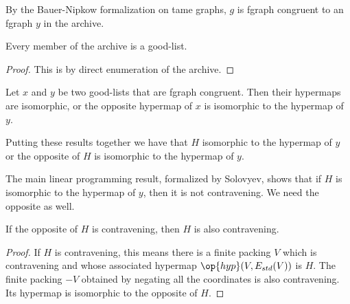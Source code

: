 By the Bauer-Nipkow formalization on tame graphs, $g$ is 
fgraph congruent
to an fgraph $y$ in the archive.

\begin{lemma}
 Every member of the archive 
is a good-list.
\end{lemma} 

\begin{proof} This is by direct enumeration of the archive.
\end{proof}

\begin{lemma}
Let $x$ and $y$ be two good-lists that are fgraph congruent.
Then their hypermaps are isomorphic, or the opposite hypermap of $x$
is isomorphic to the hypermap of $y$.
\end{lemma} 

Putting these results together we have that $H$ isomorphic to the
hypermap of $y$ or the opposite of $H$ is isomorphic to the hypermap
of $y$.

The main linear programming result, formalized by Solovyev, shows
that if $H$ is isomorphic to the hypermap of $y$, then it is not
contravening.  We need the opposite as well.

\begin{lemma}
 If the opposite of $H$ is contravening, then  $H$
is also contravening.  
\end{lemma} 

\begin{proof}
  If $H$ is contravening, this means there is a finite packing $V$
  which is contravening and whose associated hypermap
  $\op{hyp}(V,E_{std}(V))$ is $H$.  The finite packing $-V$ obtained
  by negating all the coordinates is also contravening.  Its hypermap
  is isomorphic to the opposite of $H$.
\end{proof}















